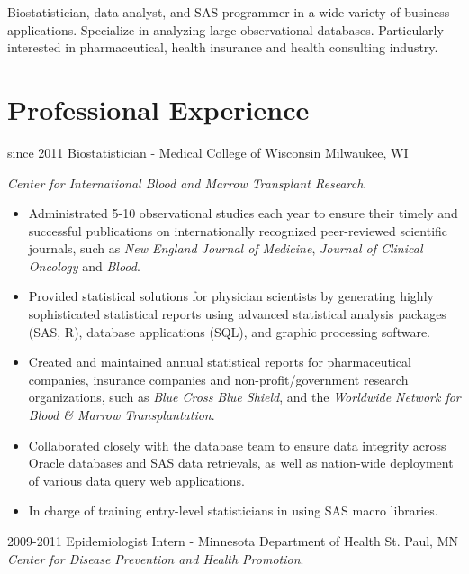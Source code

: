 Biostatistician, data analyst, and SAS programmer in a wide variety of business applications. Specialize in analyzing large observational databases. Particularly interested in pharmaceutical, health insurance and health consulting industry.\\

\section{Professional Experience}

\begin{entrylist}
  \entry
    {since 2011}
    {Biostatistician - Medical College of Wisconsin}
    {Milwaukee, WI}
    {
    \textit{Center for International Blood and Marrow Transplant Research}.
    \begin{itemize}
      \item Administrated 5-10 observational studies each year to ensure their timely and successful publications on internationally recognized peer-reviewed scientific journals, such as \textit{New England Journal of Medicine}, \textit{Journal of Clinical Oncology} and \textit{Blood}.
      \item Provided statistical solutions for physician scientists by generating highly sophisticated statistical reports using advanced statistical analysis packages (SAS, R), database applications (SQL), and graphic processing software.
      \item Created and maintained annual statistical reports for pharmaceutical companies, insurance companies and non-profit/government research organizations, such as \textit{Blue Cross Blue Shield}, and the \textit{Worldwide Network for Blood \& Marrow Transplantation}.
      \item Collaborated closely with the database team to ensure data integrity across Oracle databases and SAS data retrievals, as well as nation-wide deployment of various data query web applications.
      \item In charge of training entry-level statisticians in using SAS macro libraries.
    \end{itemize}
    }
  \entry
    {2009-2011}
    {Epidemiologist Intern - Minnesota Department of Health}
    {St. Paul, MN}
    {
    \textit{Center for Disease Prevention and Health Promotion}.
}
\end{entrylist}
